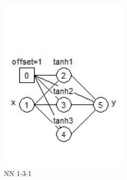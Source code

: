 \begin{figure}
    \centering
    \begin{subfigure}[b]{0.242\textwidth}
        \includegraphics[width=\textwidth]{RN3a2.png}
        \caption{NN 1-3-1}
        \label{fig:N131}
    \end{subfigure}
    ~ 
    \begin{subfigure}[b]{0.250\textwidth}

\end{subfigure}
\end{figure}
